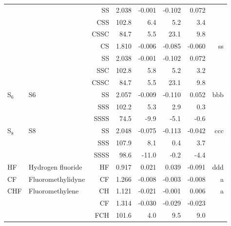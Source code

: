 \begin{table}
\begin{center}
\begin{tabular}{llrrrrrr}
             &                                    &SS            &     2.038   &    -0.001 &    -0.102 &     0.072 &       \\
             &                                    &CSS         &     102.8   &       6.4 &       5.2 &       3.4   &       \\
             &                                    &CSSC        &      84.7   &       5.5 &      23.1 &       9.8   &       \\
             &                                    &CS            &     1.810   &    -0.006 &    -0.085 &    -0.060 &    ss \\
             &                                    &SS            &     2.038   &    -0.001 &    -0.102 &     0.072 &       \\
             &                                    &SSC         &     102.8   &       5.8 &       5.2 &       3.2   &       \\
             &                                    &CSSC        &      84.7   &       5.5 &      23.1 &       9.8   &       \\
 S$_6$          & S6                                 &SS            &     2.057   &    -0.009 &    -0.110 &     0.052 &   bbb \\
             &                                    &SSS         &     102.2   &       5.3 &       2.9 &       0.3   &       \\
             &                                    &SSSS        &      74.5   &      -9.9 &      -5.1 &      -0.6   &       \\
 S$_8$          & S8                                 &SS            &     2.048   &    -0.075 &    -0.113 &    -0.042 &   ccc \\
             &                                    &SSS         &     107.9   &       8.1 &       0.4 &       3.7   &       \\
             &                                    &SSSS        &      98.6   &     -11.0 &      -0.2 &      -4.4   &       \\
 HF          & Hydrogen fluoride                  &HF            &     0.917   &     0.021 &     0.039 &    -0.091 &   ddd \\
 CF          & Fluoromethylidyne                  &CF            &     1.266   &    -0.008 &    -0.003 &    -0.008 &     a \\
 CHF         & Fluoromethylene                    &CH            &     1.121   &    -0.021 &    -0.001 &     0.006 &     a \\
             &                                    &CF            &     1.314   &    -0.030 &    -0.029 &    -0.023 &       \\
             &                                    &FCH         &     101.6   &       4.0 &       9.5 &       9.0   &       \\
\hline
\end{tabular}
\end{center}
\end{table}
\clearpage

